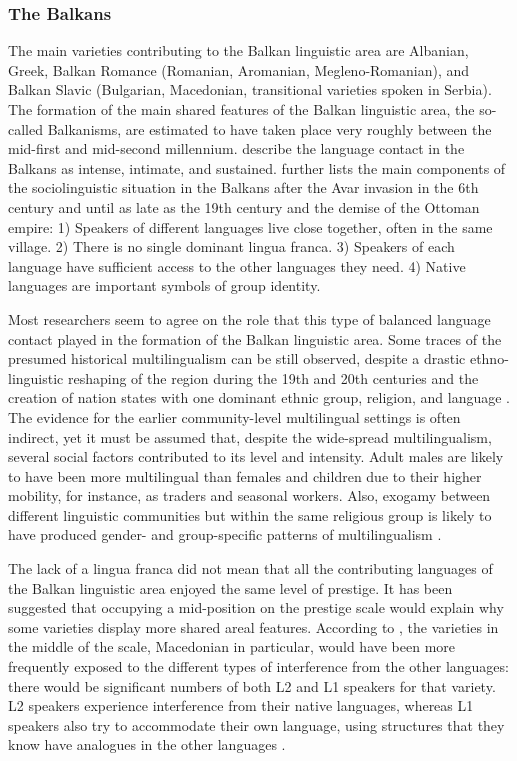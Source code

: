 \documentclass[output=paper]{langscibook}
\begin{document}
\subsubsection{The Balkans}

The main varieties contributing to the Balkan linguistic area are Albanian, Greek, Balkan Romance (Romanian, Aromanian, Megleno-Romanian), and Balkan Slavic (Bulgarian, Macedonian, transitional varieties spoken in Serbia). The formation of the main shared features of the Balkan linguistic area, the so-called Balkanisms, are estimated to have taken place very roughly between the mid-first and mid-second millennium. \textcite{friedmanjoseph14} describe the language contact in the Balkans as intense, intimate, and sustained. \textcite[239]{lindstedt00} further lists the main components of the sociolinguistic situation in the Balkans after the Avar invasion in the 6th century and until as late as the 19th century and the demise of the Ottoman empire: 1) Speakers of different languages live close together, often in the same village. 2) There is no single dominant lingua franca. 3) Speakers of each language have sufficient access to the other languages they need. 4) Native languages are important symbols of group identity.

Most researchers seem to agree on the role that this type of balanced language contact played in the formation of the Balkan linguistic area. Some traces of the presumed historical multilingualism can be still observed, despite a drastic ethno-linguistic reshaping of the region during the 19th and 20th centuries and the creation of nation states with one dominant ethnic group, religion, and language \parencite[4--10]{makartsevandwahlstrom16}. The evidence for the earlier community-level multilingual settings is often indirect, yet it must be assumed that, despite the wide-spread multilingualism, several social factors contributed to its level and intensity. Adult males are likely to have been more multilingual than females and children due to their higher mobility, for instance, as traders and seasonal workers. Also, exogamy between different linguistic communities but within the same religious group is likely to have produced gender- and group-specific patterns of multilingualism \parencite[see, e.g.,][]{morozova17}.


The lack of a lingua franca did not mean that all the contributing languages of the Balkan linguistic area enjoyed the same level of prestige. It has been suggested that occupying a mid-position on the prestige scale would explain why some varieties display more shared areal features. According to \textcite{lindstedt2018}, the varieties in the middle of the scale, Macedonian in particular, would have been more frequently exposed to the different types of interference from the other languages: there would be significant numbers of both L2 and L1 speakers for that variety. L2 speakers experience interference from their native languages, whereas L1 speakers also try to accommodate their own language, using structures that they know have analogues in the other languages \parencite[see also][624--628]{joseph2010}.
\end{document}
